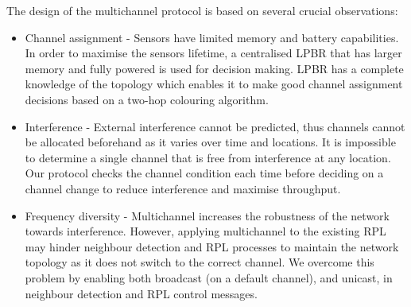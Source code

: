 The design of the multichannel protocol is based on several crucial observations:
\begin{itemize}
\item Channel assignment - Sensors have limited memory and battery capabilities. In order to maximise the sensors lifetime, a centralised LPBR that has larger memory and fully powered is used for decision making. LPBR has a complete knowledge of the topology which enables it to make good channel assignment decisions based on a two-hop colouring algorithm.

\item Interference - External interference cannot be predicted, thus channels cannot be allocated beforehand as it varies over time and locations. It is impossible to determine a single channel that is free from interference at any location. Our protocol checks the channel condition each time before deciding on a channel change to reduce interference and maximise throughput.

\item Frequency diversity - Multichannel increases the robustness of the network towards interference. However, applying multichannel to the existing RPL may hinder neighbour detection and RPL processes to maintain the network topology as it does not switch to the correct channel. We overcome this problem by enabling both broadcast (on a default channel), and unicast, in neighbour detection and RPL control messages. 



\end{itemize}

